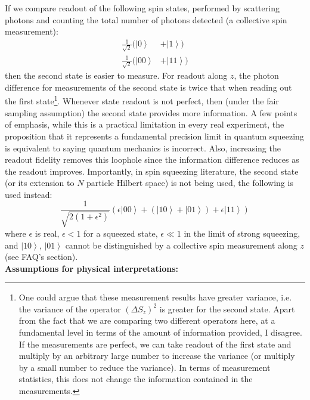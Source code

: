 \documentclass[reqno]{amsart}
\newcommand{\ket}[1]{\left| #1 \right>}
\begin{document}
If we compare readout of the following spin states, performed by scattering photons and counting the total number of photons detected (a collective spin measurement):
\begin{align*}
\frac{1}{\sqrt{2}}(\ket{0}& + \ket{1})\\
\frac{1}{\sqrt{2}}(\ket{00}& + \ket{11})
\end{align*}
then the second state is easier to measure. For readout along $z$, the photon difference for measurements of the second state is twice that when reading out the first state\footnote{One could argue that these measurement results have greater variance, i.e. the variance of the operator $(\Delta S_z)^2$ is greater for the second state. Apart from the fact that we are comparing two different operators here, at a fundamental level in terms of the amount of information provided, I disagree. If the measurements are perfect, we can take readout of the first state and multiply by an arbitrary large number to increase the variance (or multiply by a small number to reduce the variance). In terms of measurement statistics, this does not change the information contained in the measurements.}. Whenever state readout is not perfect, then (under the fair sampling assumption) the second state provides more information. A few points of emphasis, while this is a practical limitation in every real experiment, the proposition that it represents a fundamental precision limit in quantum squeezing is equivalent to saying quantum mechanics is incorrect. Also, increasing the readout fidelity removes this loophole since the information difference reduces as the readout improves. Importantly, in spin squeezing literature, the second state (or its extension to $N$ particle Hilbert space) is not being used, the following is used instead:
\[ \frac{1}{\sqrt{2(1+\epsilon^2)}}\left(\epsilon\ket{00} + \left(\ket{10}+\ket{01}\right) + \epsilon\ket{11}\right) \]
where $\epsilon$ is real, $\epsilon <1$ for a squeezed state, $\epsilon \ll 1$ in the limit of strong squeezing, and $\ket{10}$, $\ket{01}$ cannot be distinguished by a collective spin measurement along $z$ \cite{Kitagawa1993, Ma2011, Andre2002, Vuletic2023} (see FAQ's section).\\


\noindent\textbf{Assumptions for physical interpretations:}
\end{document}
